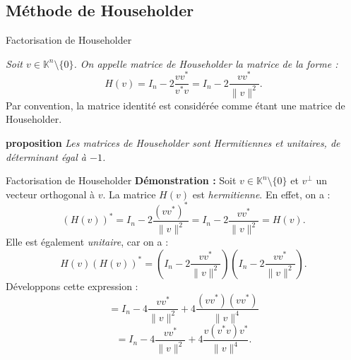 \documentclass[french, 10pt]{beamer}
\theoremstyle{definition}
\begin{document}
\subsection{Méthode de Householder}
\begin{frame}{Factorisation de Householder}
	\begin{definition}
		\textit{Soit $v \in \mathbb{K}^n \setminus \{0\}$. On appelle matrice de Householder la matrice de la forme :}
		\[
		H(v) = I_n - 2 \frac{v v^*}{v^* v} = I_n - 2 \frac{v v^*}{\|v\|^2}.
		\]
		Par convention, la matrice identité est considérée comme étant une matrice de Householder.
		
	\end{definition}
	\textbf{proposition}
	\textit{Les matrices de Householder sont Hermitiennes et unitaires, de déterminant égal à $-1$.}
	
	
\end{frame}
\begin{frame}{Factorisation de Householder}
	\textbf{Démonstration :} Soit $v \in \mathbb{K}^n \setminus \{0\}$ et $v^\perp$ un vecteur orthogonal à $v$. La matrice $H(v)$ est \textit{hermitienne}. En effet, on a :
	\[
	(H(v))^* = I_n - 2 \frac{(v v^*)^*}{\|v\|^2} = I_n - 2 \frac{v v^*}{\|v\|^2} = H(v).
	\]
	Elle est également \textit{unitaire}, car on a :
	\[
	H(v) (H(v))^* = \left( I_n - 2 \frac{v v^*}{\|v\|^2} \right) \left( I_n - 2 \frac{v v^*}{\|v\|^2} \right).
	\]
	Développons cette expression :
	\[
	= I_n - 4 \frac{v v^*}{\|v\|^2} + 4 \frac{(v v^*)(v v^*)}{\|v\|^4}
	\]
	\[
	= I_n - 4 \frac{v v^*}{\|v\|^2} + 4 \frac{v (v^* v) v^*}{\|v\|^4}.
	\]
	
\end{frame}
\end{document}
